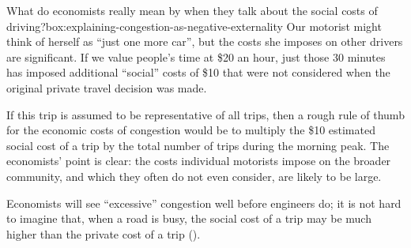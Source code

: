\begin{bigbox}{What do economists really mean by when they talk about the social costs of driving?}{box:explaining-congestion-as-negative-externality}
Our motorist might think of herself as “just one more car”, but the costs she imposes on other drivers are significant.
If we value people's time at \$20 an hour, just those 30 minutes has imposed additional “social” costs of \$10 that were not considered when the original private travel decision was made.

If this trip is assumed to be representative of all trips, then a rough rule of thumb for the economic costs of congestion would be to multiply the \$10 estimated social cost of a trip by the total number of trips during the morning peak.
The economists' point is clear: the costs individual motorists impose on the broader community, and which they often do not even consider, are likely to be large.

\end{bigbox}

Economists will see ``excessive'' congestion well before engineers do; it is not hard to imagine that, when a road is busy, the social cost of a trip may be much higher than the private cost of a trip ().

\label{para:three-perspectives-on-congestion--end}

